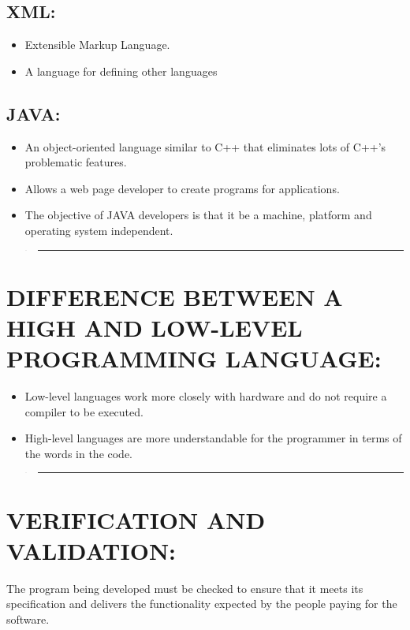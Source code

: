 \documentclass[10pt,english]{article}
\begin{document}
\subsection{XML: }
\begin{itemize}
\item Extensible Markup Language. 
\item A language for defining other languages 
\end{itemize}

\subsection{JAVA: }
\begin{itemize}
\item An object-oriented language similar to C++ that eliminates lots of
C++’s problematic features.
\item Allows a web page developer to create programs for applications. 
\item The objective of JAVA developers is that it be a machine, platform
and operating system independent.
\end{itemize}
\begin{verse}
\rule[0.5ex]{1\columnwidth}{1pt}
\end{verse}

\section{DIFFERENCE BETWEEN A HIGH AND LOW-LEVEL PROGRAMMING LANGUAGE: }
\begin{itemize}
\item Low-level languages work more closely with hardware and do not require
a compiler to be executed. 
\item High-level languages are more understandable for the programmer in
terms of the words in the code.
\end{itemize}
\begin{verse}
\rule[0.5ex]{1\columnwidth}{1pt}
\end{verse}

\section{VERIFICATION AND VALIDATION: }

The program being developed must be checked to ensure that it meets
its specification and delivers the functionality expected by the people
paying for the software.
\end{document}
